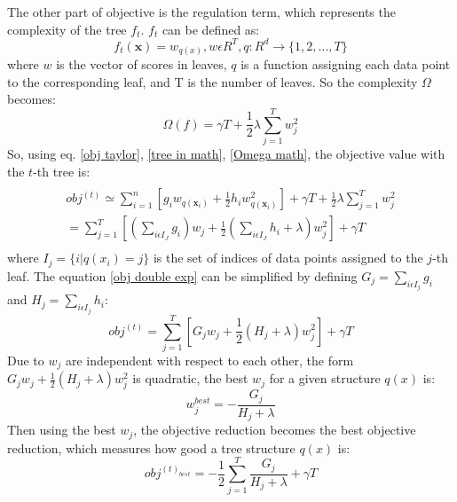 \documentclass[a4paper, oneside]{book}
\begin{document}
			The other part of objective is the regulation term, which represents the complexity of the tree $f_t$. $f_t$ can be defined as:
			\begin{equation}
				f_t(\textbf{x}) = w_{q(x)}, w \epsilon R^T, q:R^d \rightarrow \{1,2,...,T\}
				\label{tree in math}
			\end{equation}
			where $w$ is the vector of scores in leaves, $q$ is a function assigning each data point to the corresponding leaf, and T is the number of leaves. So the complexity $\Omega$ becomes:
			\begin{equation}
				\Omega(f) = \gamma T + \frac{1}{2} \lambda \sum_{j=1}^{T} w_j^2
				\label{Omega math}
			\end{equation}
			So, using eq. \eqref{obj taylor}, \eqref{tree in math}, \eqref{Omega math}, the objective value with the $t$-th tree is:
			\begin{multline}
				\\obj^{(t)} \simeq \sum_{i=1}^{n}[g_i w_{q(\textbf{x}_i)} +\frac{1}{2}h_iw_{q(\textbf{x}_i)}^2] +\gamma T + \frac{1}{2}\lambda\sum_{j=1}^{T} w_j^2\\
				=\sum_{j=1}^{T}[(\sum_{i\epsilon I_J}g_i)w_j + \frac{1}{2}(\sum_{i\epsilon I_J}h_i + \lambda)w_j^2] + \gamma T\\
				\label{obj double exp}
			\end{multline}
			where $I_j=\{i|q(x_i)=j\}$ is the set of indices of data points assigned to the $j$-th leaf. 
			The equation \eqref{obj double exp} can be simplified by defining $G_j = \sum_{i\epsilon I_j}g_i$ and $H_j = \sum_{i\epsilon I_j}h_i$:
			\begin{equation}
				obj^{(t)} =\sum_{j=1}^{T}[G_j w_j + \frac{1}{2}(H_j + \lambda)w_j^2] + \gamma T
				\label{obj simple}
			\end{equation}
			Due to $w_j$ are independent with respect to each other, the form $G_jw_j+\frac{1}{2}(H_j+\lambda)w^2_j$ is quadratic, the best $w_j$ for a given structure $q(x)$ is:
			\begin{equation}
				w_j^{best} = -\dfrac{G_j}{H_j + \lambda}
				\label{best w_j}
			\end{equation}
			Then using the best $w_j$, the objective reduction becomes the best objective reduction, which measures how good a tree structure $q(x)$ is:
			\begin{equation}
				obj^{(t)_{best}} = -\frac{1}{2}\sum_{j=1}^{T}\dfrac{G_j}{H_j + \lambda} + \gamma T
				\label{best obj}
			\end{equation}
			
\end{document}
